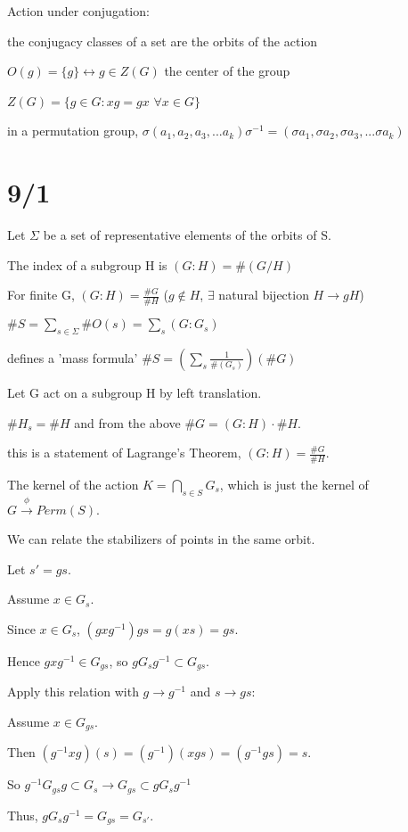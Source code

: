 \documentclass[12pt]{article}
\newcommand{\inv}{^{-1}}
\begin{document}
\noindent
Action under conjugation:

the conjugacy classes of a set are the orbits of the action

$O(g) = \{g\} \leftrightarrow g \in Z(G)$ the center of the group

$Z(G) = \{g \in G : xg = gx$ $\forall x \in G\}$

in a permutation group, $\sigma (a_1, a_2, a_3, ... a_k) \sigma^{-1} = (\sigma a_1, \sigma a_2, \sigma a_3, ... \sigma a_k)$

\section{9/1}

\noindent
Let $\Sigma$ be a set of representative elements of the orbits of S.

The index of a subgroup H is $(G : H) = \#(G/H)$

For finite G, $(G:H) = \frac{\#G}{\#H}$ ($g \not \in H$, $\exists$ natural bijection $H \to gH$)

$\#S = \sum_{s \in \Sigma}\#O(s) = \sum_s(G:G_s)$

defines a 'mass formula' $\#S = (\sum_s\frac{1}{\#(G_s)})(\#G)$

\noindent
Let G act on a subgroup H by left translation.

$\#H_s = \#H$ and from the above $\#G = (G:H) \cdot \#H$. 

this is a statement of Lagrange's Theorem, $(G:H) = \frac{\#G}{\#H}$.

\noindent
The kernel of the action $K = \bigcap_{s \in S}G_s$, which is just the kernel of $G \xrightarrow{\phi} Perm(S)$.

\noindent
We can relate the stabilizers of points in the same orbit.

Let $s' = gs$.

Assume $x \in G_s$.  

Since $x \in G_s$, $(gxg^{-1})gs = g(xs) = gs$.

Hence $gxg^{-1} \in G_{gs}$, so $gG_sg^{-1} \subset G_{gs}$.

Apply this relation with $g \to g^{-1}$ and $s \to gs$:

Assume $x \in G_{gs}$.

Then $(g\inv xg)(s) = (g\inv)(xgs) = (g\inv gs) = s$.

So $g\inv G_{gs}g \subset G_s \to G_{gs} \subset gG_sg\inv$

\noindent
Thus, $gG_sg\inv = G_{gs} = G_{s'}$.
\end{document}
